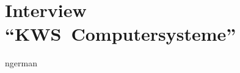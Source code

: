 
\chapter{Interview \enquote{KWS~Computersysteme}}
\label{chap:appendix:interview:kws}
\begin{otherlanguage*}{ngerman}
\begin{linenumbers*}
\begin{description}[leftmargin=4cm, labelwidth=4cm]
    \item[Interviewer] \noindent \lipsum[1]
    \item[Partner] \noindent \lipsum[2]
    \item[Interviewer] \noindent \lipsum[1-2]
    \item[Partner] \noindent \lipsum[4]
\end{description}
\end{linenumbers*}
\end{otherlanguage*}